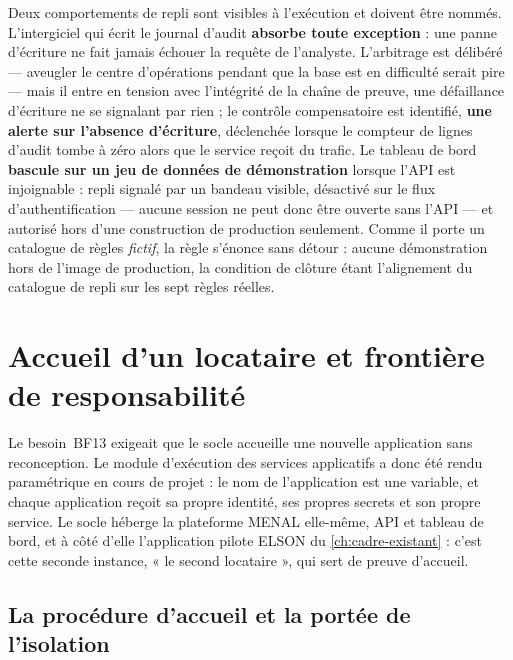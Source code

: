 Deux comportements de repli sont visibles à l'exécution et doivent être nommés. L'intergiciel qui
écrit le journal d'audit \textbf{absorbe toute exception} : une panne d'écriture ne fait jamais
échouer la requête de l'analyste. L'arbitrage est délibéré --- aveugler le centre d'opérations
pendant que la base est en difficulté serait pire --- mais il entre en tension avec l'intégrité de la
chaîne de preuve, une défaillance d'écriture ne se signalant par rien ; le contrôle compensatoire est
identifié, \textbf{une alerte sur l'absence d'écriture}, déclenchée lorsque le compteur de lignes
d'audit tombe à zéro alors que le service reçoit du trafic. Le tableau de bord \textbf{bascule sur un
jeu de données de démonstration} lorsque l'API est injoignable : repli signalé par un bandeau
visible, désactivé sur le flux d'authentification --- aucune session ne peut donc être ouverte sans
l'API --- et autorisé hors d'une construction de production seulement. Comme il porte un catalogue de
règles \emph{fictif}, la règle s'énonce sans détour : aucune démonstration hors de l'image de
production, la condition de clôture étant l'alignement du catalogue de repli sur les sept règles
réelles.

\section{Accueil d'un locataire et frontière de responsabilité}
\label{sec:locataire}
\label{sec:second-locataire}

Le besoin~BF13 exigeait que le socle accueille une nouvelle application sans reconception. Le module
d'exécution des services applicatifs a donc été rendu paramétrique en cours de projet : le nom de
l'application est une variable, et chaque application reçoit sa propre identité, ses propres secrets
et son propre service. Le socle héberge la plateforme MENAL elle-même, API et tableau de bord, et à
côté d'elle l'application pilote ELSON du \cref{ch:cadre-existant} : c'est cette seconde instance, « le second
locataire », qui sert de preuve d'accueil.

\subsection{La procédure d'accueil et la portée de l'isolation}


